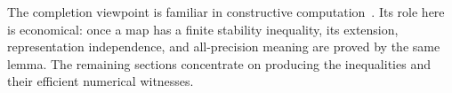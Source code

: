 The completion viewpoint is familiar in constructive computation~\cite{oconnor2007}. Its role here is economical: once a map has a finite stability inequality, its extension, representation independence, and all-precision meaning are proved by the same lemma. The remaining sections concentrate on producing the inequalities and their efficient numerical witnesses.
